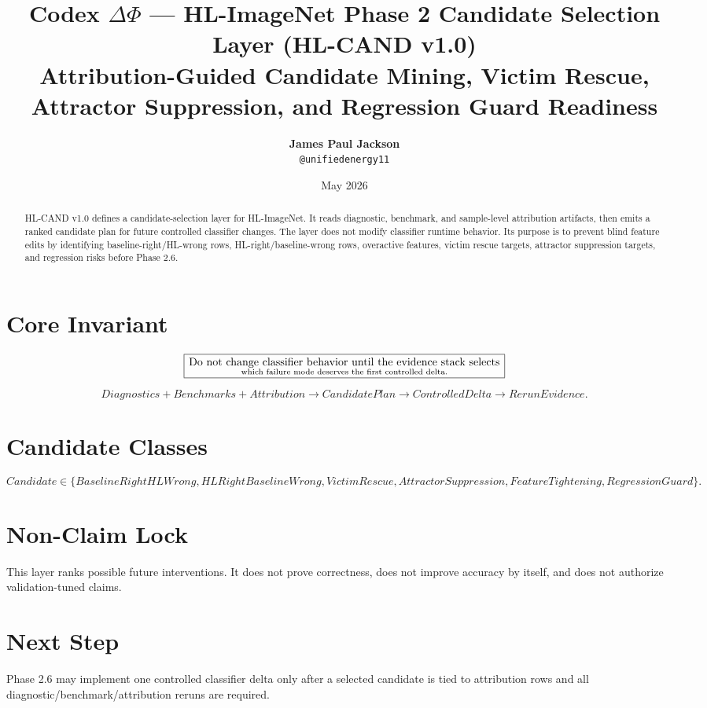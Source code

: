 \documentclass[12pt]{article}
\title{\textbf{Codex $\Delta\Phi$ — HL-ImageNet Phase 2 Candidate Selection Layer (HL-CAND v1.0)}\\
\large Attribution-Guided Candidate Mining, Victim Rescue, Attractor Suppression, and Regression Guard Readiness}
\author{\textbf{James Paul Jackson}\\ \small \texttt{@unifiedenergy11}}
\date{May 2026}
\begin{document}
\maketitle

\begin{abstract}
HL-CAND v1.0 defines a candidate-selection layer for HL-ImageNet. It reads
diagnostic, benchmark, and sample-level attribution artifacts, then emits a
ranked candidate plan for future controlled classifier changes. The layer does
not modify classifier runtime behavior. Its purpose is to prevent blind feature
edits by identifying baseline-right/HL-wrong rows, HL-right/baseline-wrong rows,
overactive features, victim rescue targets, attractor suppression targets, and
regression risks before Phase 2.6.
\end{abstract}

\section{Core Invariant}

\[
\boxed{
\text{Do not change classifier behavior until the evidence stack selects}
\atop
\text{which failure mode deserves the first controlled delta.}
}
\]

\[
Diagnostics + Benchmarks + Attribution
\rightarrow CandidatePlan
\rightarrow ControlledDelta
\rightarrow RerunEvidence.
\]

\section{Candidate Classes}

\[
Candidate \in
\{
BaselineRightHLWrong,
HLRightBaselineWrong,
VictimRescue,
AttractorSuppression,
FeatureTightening,
RegressionGuard
\}.
\]

\section{Non-Claim Lock}

This layer ranks possible future interventions. It does not prove correctness,
does not improve accuracy by itself, and does not authorize validation-tuned
claims.

\section{Next Step}

Phase 2.6 may implement one controlled classifier delta only after a selected
candidate is tied to attribution rows and all diagnostic/benchmark/attribution
reruns are required.
\end{document}
